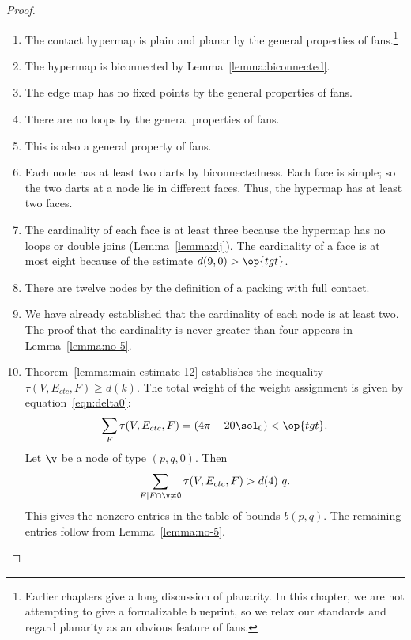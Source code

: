 \begin{proof}
\begin{enumerate}
\item {} The contact hypermap is plain and planar by the
  general properties of fans.\footnote{Earlier chapters give a long
    discussion of planarity.  In this chapter, we are not attempting
    to give a formalizable blueprint, so we relax our standards and
    regard planarity as an obvious feature of fans.}
\item {} The hypermap is biconnected by
  Lemma~\ref{lemma:biconnected}.
\item {} The
  edge map has no fixed points by the general properties of fans.
\item {} 
  There are no loops by the general properties of
  fans.
\item {} This is also a general property of fans.
\item {} Each node has at least two darts by
  biconnectedness. Each face is simple; so the two darts at a node lie
  in different faces.  Thus, the hypermap has at least two faces.
\item {} The cardinality of each face is at least three
  because the hypermap has no loops or double joins (Lemma~\ref{lemma:dj}).
  The cardinality of a face is at most eight because of the estimate
  $d(9,0)>\op{tgt}$.
\item {} There are twelve nodes by the definition of a
  packing with full contact.
\item {} We have already established that the cardinality
  of each node is at least two.  The proof that the cardinality is
  never  greater than four appears in Lemma~\ref{lemma:no-5}.
\item {} Theorem~\ref{lemma:main-estimate-12} establishes 
 the inequality $\tau(V,E_{ctc},F)\ge d(k)$.
  The total weight of the weight assignment is given by
  equation~\eqref{eqn:delta0}:
\[
  \sum_F \tau(V,E_{ctc},F) = (4\pi - 20\sol_0) < \op{tgt}.
\]
%
Let $\v$ be a node of type $(p,q,0)$.  
Then
\[
\sum_{F\mid F\cap \v\ne\emptyset}\tau(V,E_{ctc},F) > d(4)~q.
\]
This gives the nonzero entries in the table of bounds $b(p,q)$.  The
remaining entries follow from Lemma~\ref{lemma:no-5}.
\end{enumerate}
\end{proof}




